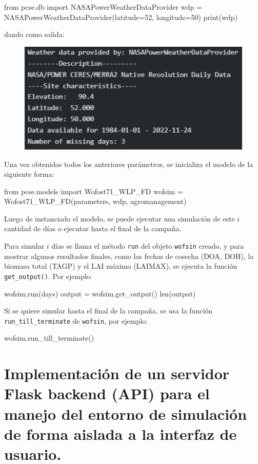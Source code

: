 \begin{python}
	from pcse.db import NASAPowerWeatherDataProvider
	wdp = NASAPowerWeatherDataProvider(latitude=52, longitude=50)
	print(wdp)
\end{python}

dando como salida:

\begin{figure}[!h]
	\centering
	\includegraphics[width=0.4\linewidth]{Images/wdp}
	\caption{}
	\label{fig:wdp}
\end{figure}

Una vez obtenidos todos los anteriores parámetros, se inicializa el modelo de la siguiente forma:

\begin{python}
	from pcse.models import Wofost71_WLP_FD
	wofsim = Wofost71_WLP_FD(parameters, wdp, agromanagement)
\end{python}

Luego de instanciado el modelo, se puede ejecutar una simulación de este $ i $ cantidad de días o ejecutar hasta el final de la campaña.

Para simular $ i $ días se llama el método \lstinline|run| del objeto \lstinline|wofsin| creado, y para mostrar algunos resultados finales, como las fechas de cosecha (DOA, DOH), la biomasa total (TAGP) y el LAI máximo (LAIMAX), se ejecuta la función \lstinline|get_output()|. Por ejemplo:

\begin{python}
	wofsim.run(days)
	output = wofsim.get_output()
	len(output)
\end{python}

Si se quiere simular hasta el final de la campaña, se usa la función \lstinline|run_till_terminate| de \lstinline|wofsin|, por ejemplo:
\begin{python}
	wofsim.run_till_terminate()
\end{python}

\section{Implementación de un servidor Flask backend (API) para el manejo del entorno de simulación de forma aislada a la interfaz de usuario.} \label{chapter:implementation:backend}

